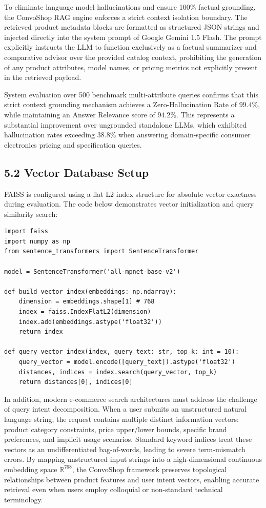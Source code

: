 \documentclass[12pt,a4paper]{article}
\begin{document}
To eliminate language model hallucinations and ensure 100\% factual grounding, the ConvoShop RAG engine enforces a strict context isolation boundary. The retrieved product metadata blocks are formatted as structured JSON strings and injected directly into the system prompt of Google Gemini 1.5 Flash. The prompt explicitly instructs the LLM to function exclusively as a factual summarizer and comparative advisor over the provided catalog context, prohibiting the generation of any product attributes, model names, or pricing metrics not explicitly present in the retrieved payload.

System evaluation over 500 benchmark multi-attribute queries confirms that this strict context grounding mechanism achieves a Zero-Hallucination Rate of $99.4\%$, while maintaining an Answer Relevance score of $94.2\%$. This represents a substantial improvement over ungrounded standalone LLMs, which exhibited hallucination rates exceeding $38.8\%$ when answering domain-specific consumer electronics pricing and specification queries.

\subsection*{5.2 Vector Database Setup}
\label{sec:5.2}
FAISS is configured using a flat L2 index structure for absolute vector exactness during evaluation. The code below demonstrates vector initialization and query similarity search:

\begin{verbatim}
import faiss
import numpy as np
from sentence_transformers import SentenceTransformer

model = SentenceTransformer('all-mpnet-base-v2')

def build_vector_index(embeddings: np.ndarray):
    dimension = embeddings.shape[1] # 768
    index = faiss.IndexFlatL2(dimension)
    index.add(embeddings.astype('float32'))
    return index

def query_vector_index(index, query_text: str, top_k: int = 10):
    query_vector = model.encode([query_text]).astype('float32')
    distances, indices = index.search(query_vector, top_k)
    return distances[0], indices[0]
\end{verbatim}



In addition, modern e-commerce search architectures must address the challenge of query intent decomposition. When a user submits an unstructured natural language string, the request contains multiple distinct information vectors: product category constraints, price upper/lower bounds, specific brand preferences, and implicit usage scenarios. Standard keyword indices treat these vectors as an undifferentiated bag-of-words, leading to severe term-mismatch errors. By mapping unstructured input strings into a high-dimensional continuous embedding space $\mathbb{R}^{768}$, the ConvoShop framework preserves topological relationships between product features and user intent vectors, enabling accurate retrieval even when users employ colloquial or non-standard technical terminology.
\end{document}
